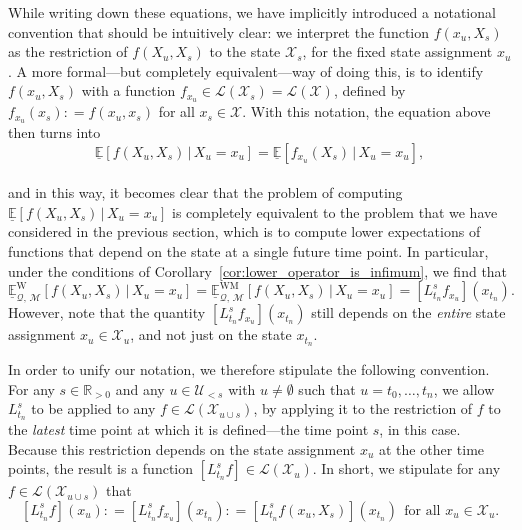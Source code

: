 \documentclass[10pt,a4paper]{paper}
\theoremstyle{definition}
\newcommand{\reals}{\mathbb{R}}
\newcommand{\realspos}{\reals_{>0}}
\newcommand{\states}{\mathcal{X}}
\newcommand{\gambles}{\mathcal{L}}
\newcommand{\gamblesX}{\gambles(\states)}
\newcommand{\rateset}{\mathcal{Q}}
\newcommand{\coloneqq}{:\!=}
\begin{document}
While writing down these equations, we have implicitly introduced a notational convention that should be intuitively clear: we interpret the function $f(x_u,X_s)$ as the restriction of $f(X_u,X_s)$ to the state $\states_s$, for the fixed state assignment $x_u$. A more formal---but completely equivalent---way of doing this, is to identify $f(x_u,X_s)$ with a function $f_{x_u}\in\gambles(\states_s)=\gamblesX$, defined by $f_{x_u}(x_s)\coloneqq f(x_u,x_s)$ for all $x_s\in\states$.
With this notation, the equation above then turns into
\begin{equation*}%
\underline{\mathbb{E}}[f(X_u,X_s)\,\vert\,X_u=x_u] = \underline{\mathbb{E}}[f_{x_u}(X_s)\,\vert\,X_u=x_u],
\end{equation*}\\[-14pt]
and in this way, it becomes clear that the problem of computing $\underline{\mathbb{E}}[f(X_u,X_s)\,\vert\,X_u=x_u]$ is completely equivalent to the problem that we have considered in the previous section, which is to compute lower expectations of functions that depend on the state at a single future time point.
In particular, under the conditions of Corollary~\ref{cor:lower_operator_is_infimum}, we find that
\begin{equation*}
\underline{\mathbb{E}}_{\rateset,\,\mathcal{M}}^{\mathrm{W}}[f(X_u,X_s)\,\vert\,X_u=x_u] = \underline{\mathbb{E}}_{\rateset,\,\mathcal{M}}^{\mathrm{WM}}[f(X_u,X_s)\,\vert\,X_u=x_u]=\left[L_{t_n}^sf_{x_u}\right](x_{t_n}).
\end{equation*}
However, note that the quantity $[L_{t_n}^sf_{x_u}](x_{t_n})$ still depends on the \emph{entire} state assignment $x_u\in\states_u$, and not just on the state $x_{t_n}$.

In order to unify our notation, we therefore stipulate the following convention. For any $s\in\realspos$ and any $u\in\mathcal{U}_{<s}$ with $u\neq\emptyset$ such that $u=t_0,\ldots,t_n$, we allow $L_{t_n}^s$ to be applied to any $f\in\gambles(\states_{u\cup s})$, by applying it to the restriction of $f$ to the \emph{latest} time point at which it is defined---the time point $s$, in this case. Because this restriction depends on the state assignment $x_u$ at the other time points, the result is a function $[L_{t_n}^sf]\in\gambles(\states_u)$. In short, we stipulate for any $f\in\gambles(\states_{u\cup s})$ that
\begin{equation}\label{eq:applyLtolargerfunctions}
[L_{t_n}^sf](x_u) \coloneqq [L_{t_n}^sf_{x_u}](x_{t_n}) \coloneqq [L_{t_n}^sf(x_u,X_s)](x_{t_n})
~~\text{for all $x_u\in\states_u$}.
\end{equation}
\end{document}
